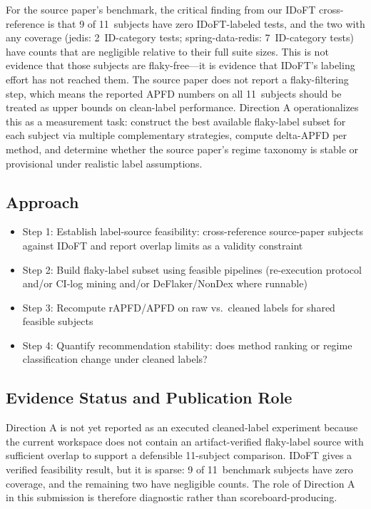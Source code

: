 \documentclass[10pt,conference]{IEEEtran}
\begin{document}
For the source paper's benchmark, the critical finding from our IDoFT cross-reference is that 9 of 11~subjects have zero IDoFT-labeled tests, and the two with any coverage (jedis: 2~ID-category tests; spring-data-redis: 7~ID-category tests) have counts that are negligible relative to their full suite sizes. This is not evidence that those subjects are flaky-free---it is evidence that IDoFT's labeling effort has not reached them. The source paper does not report a flaky-filtering step, which means the reported APFD numbers on all 11~subjects should be treated as upper bounds on clean-label performance. Direction A operationalizes this as a measurement task: construct the best available flaky-label subset for each subject via multiple complementary strategies, compute delta-APFD per method, and determine whether the source paper's regime taxonomy is stable or provisional under realistic label assumptions.

\subsection{Approach}

\begin{itemize}[leftmargin=*]
\item Step 1: Establish label-source feasibility: cross-reference source-paper subjects against IDoFT and report overlap limits as a validity constraint
\item Step 2: Build flaky-label subset using feasible pipelines (re-execution protocol and/or CI-log mining and/or DeFlaker/NonDex where runnable)
\item Step 3: Recompute rAPFD/APFD on raw vs.\ cleaned labels for shared feasible subjects
\item Step 4: Quantify recommendation stability: does method ranking or regime classification change under cleaned labels?
\end{itemize}

\subsection{Evidence Status and Publication Role}

Direction A is not yet reported as an executed cleaned-label experiment because the current workspace does not contain an artifact-verified flaky-label source with sufficient overlap to support a defensible 11-subject comparison. IDoFT gives a verified feasibility result, but it is sparse: 9 of 11~benchmark subjects have zero coverage, and the remaining two have negligible counts. The role of Direction A in this submission is therefore diagnostic rather than scoreboard-producing.
\end{document}
